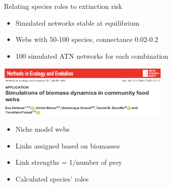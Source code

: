 \documentclass{beamer}
\newcommand*\whitem{%
  \item[\color{white}\scalebox{0.9}{\textbullet}]}
\begin{document}
  \begin{frame}{Relating species roles to extinction risk}
      \begin{itemize}
        \item Simulated networks stable at equilibrium
        \item Webs with 50-100 species, connectance 0.02-0.2
        \item 100 simulated ATN networks for each combination
      \end{itemize}

      \begin{centering}

      \includegraphics[height=1in]{intro_figs/Delmas2017.eps}

      \end{centering}

      \begin{itemize}
        \item Niche model webs
        \item Links assigned based on biomasses
        \item Link strengths = 1/number of prey
      \end{itemize}

      \begin{itemize}
        \whitem {\color{white}Calculated species' roles}
      \end{itemize}

    \end{frame}
\end{document}
